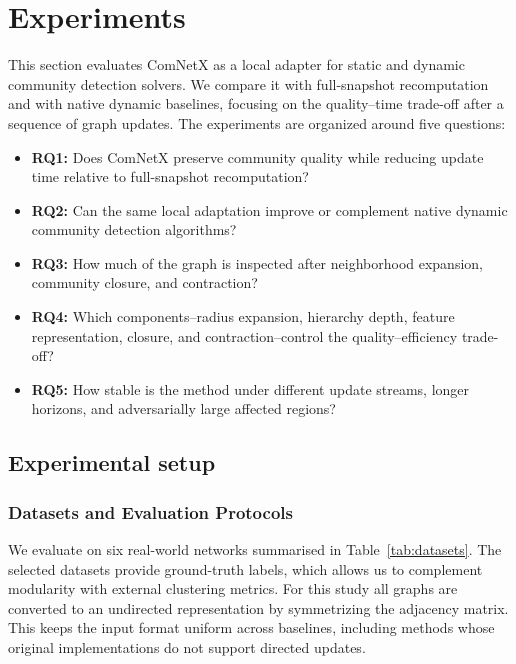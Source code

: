 \documentclass[conference]{IEEEtran}
\theoremstyle{definition}
\begin{document}

\section{Experiments} \label{S:4}

This section evaluates ComNetX as a local adapter for static and dynamic
community detection solvers. We compare it with full-snapshot recomputation
and with native dynamic baselines, focusing on the quality--time trade-off
after a sequence of graph updates.
The experiments are organized around five questions:
\begin{itemize}[leftmargin=*]
    \item \textbf{RQ1:} Does ComNetX preserve community quality while reducing
    update time relative to full-snapshot recomputation?
    \item \textbf{RQ2:} Can the same local adaptation improve or complement
    native dynamic community detection algorithms?
    \item \textbf{RQ3:} How much of the graph is inspected after neighborhood
    expansion, community closure, and contraction?
    \item \textbf{RQ4:} Which components--radius expansion, hierarchy depth,
    feature representation, closure, and contraction--control the
    quality--efficiency trade-off?
    \item \textbf{RQ5:} How stable is the method under different update streams,
    longer horizons, and adversarially large affected regions?
\end{itemize}

\subsection{Experimental setup}

\subsubsection{Datasets and Evaluation Protocols}
We evaluate on six real-world networks summarised in Table~\ref{tab:datasets}.
The selected datasets provide ground-truth labels, which allows us to complement
modularity with external clustering metrics. For this study all graphs are
converted to an undirected representation by symmetrizing the adjacency matrix.
This keeps the input format uniform across baselines, including methods whose
original implementations do not support directed updates.
\end{document}

